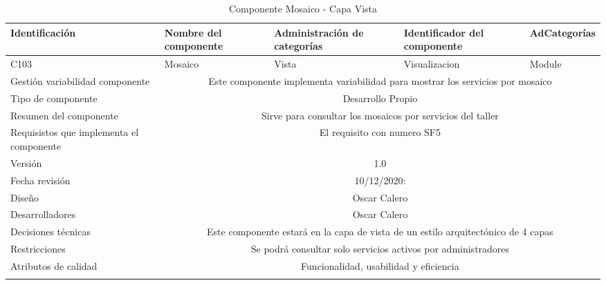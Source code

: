 \documentclass[10pt,a4paper,openany]{book}
\begin{document}
\begin{longtable}{|p{3cm}|p{3cm}|p{3cm}|p{3cm}|p{3cm}|} \hline
Identificación & Nombre del componente & Administración de categorías & Identificador del componente & AdCategorías \\[0.5ex] \hline
C103& Mosaico& Vista& Visualizacion& Module\\[0.5ex] \hline
Gestión variabilidad componente & \multicolumn{4}{|c|}{Este componente implementa variabilidad para mostrar los servicios por mosaico} \\ \hline
Tipo de componente & \multicolumn{4}{|c|}{Desarrollo Propio} \\ \hline
Resumen del componente & \multicolumn{4}{|c|}{Sirve para consultar los mosaicos por servicios del taller} \\ \hline
Requisistos que implementa el componente & \multicolumn{4}{|c|}{El requisito con numero SF5 } \\ \hline
Versión & \multicolumn{4}{|c|}{1.0 } \\ \hline
Fecha revisión & \multicolumn{4}{|c|}{ 10/12/2020:} \\ \hline
Diseño & \multicolumn{4}{|c|}{Oscar Calero} \\ \hline
Desarrolladores & \multicolumn{4}{|c|}{Oscar Calero} \\ \hline
Decisiones técnicas & \multicolumn{4}{|c|}{Este componente estará en la capa de vista de un estilo arquitectónico de 4 capas  } \\ \hline
Restricciones & \multicolumn{4}{|c|}{Se podrá consultar solo servicios activos por administradores} \\ \hline
Atributos de calidad & \multicolumn{4}{|c|}{Funcionalidad, usabilidad y eficiencia} \\ \hline
\caption{Componente Mosaico - Capa Vista}
\label{table:t6}
\end{longtable}
\end{document}
